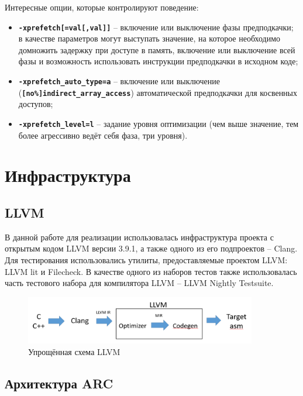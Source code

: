 \documentclass[12pt,a4paper,oneside]{article}
\begin{document}
Интересные опции, которые контролируют поведение\cite{SUN}:
\begin{itemize}
\item \texttt{\textbf{-xprefetch[=val[,val]]}} -- включение или выключение фазы предподкачки; в качестве параметров могут выступать значение, на которое необходимо домножить задержку при доступе в память, включение или выключение всей фазы и возможность использовать инструкции предподкачки в исходном коде;
\item \texttt{\textbf{-xprefetch\_auto\_type=a}} -- включение или выключение (\texttt{\textbf{[no\%]indirect\_array\_access}}) автоматической предподкачки для косвенных доступов;
\item \texttt{\textbf{-xprefetch\_level=l}} -- задание уровня оптимизации (чем выше значение, тем более агрессивно ведёт себя фаза, три уровня).
\end{itemize}

\section{Инфраструктура}

\subsection{LLVM}

\indent

В данной работе для реализации использовалась инфраструктура проекта с открытым кодом LLVM версии 3.9.1, а также одного из его подпроектов -- Clang\cite{LLVM}. Для тестирования использовались утилиты, предоставляемые проектом LLVM: LLVM lit и Filecheck\cite{LIT}. В качестве одного из наборов тестов также использовалась часть тестового набора для компилятора LLVM -- LLVM Nightly Testsuite\cite{LNT}.

\begin{figure}
  \centering
  \includegraphics[width=0.9\textwidth]{LLVM.PNG}
  \caption{Упрощённая схема LLVM}
\end{figure}

\subsection{Архитектура ARC}
\end{document}

